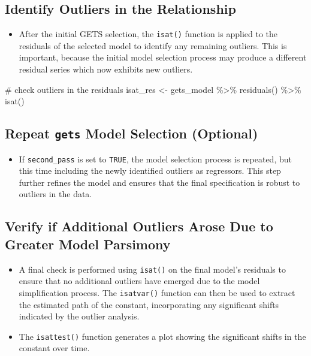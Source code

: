 \documentclass[
  letterpaper,
  DIV=11,
  numbers=noendperiod]{scrreport}
\newenvironment{Shaded}{\begin{snugshade}}{\end{snugshade}}
\newcommand{\CommentTok}[1]{\textcolor[rgb]{0.37,0.37,0.37}{#1}}
\newcommand{\FunctionTok}[1]{\textcolor[rgb]{0.28,0.35,0.67}{#1}}
\newcommand{\NormalTok}[1]{\textcolor[rgb]{0.00,0.23,0.31}{#1}}
\newcommand{\OtherTok}[1]{\textcolor[rgb]{0.00,0.23,0.31}{#1}}
\newcommand{\SpecialCharTok}[1]{\textcolor[rgb]{0.37,0.37,0.37}{#1}}
\providecommand{\tightlist}{%
  \setlength{\itemsep}{0pt}\setlength{\parskip}{0pt}}\usepackage{longtable,booktabs,array}
\begin{document}
\subsection{Identify Outliers in the
Relationship}\label{identify-outliers-in-the-relationship}

\begin{itemize}
\tightlist
\item
  After the initial GETS selection, the \texttt{isat()} function is
  applied to the residuals of the selected model to identify any
  remaining outliers. This is important, because the initial model
  selection process may produce a different residual series which now
  exhibits new outliers.
\end{itemize}

\begin{Shaded}
\begin{Highlighting}[]
\CommentTok{\# check outliers in the residuals}
\NormalTok{isat\_res }\OtherTok{\textless{}{-}}\NormalTok{ gets\_model }\SpecialCharTok{\%\textgreater{}\%}
  \FunctionTok{residuals}\NormalTok{() }\SpecialCharTok{\%\textgreater{}\%}
  \FunctionTok{isat}\NormalTok{()}
\end{Highlighting}
\end{Shaded}

\subsection{\texorpdfstring{Repeat \texttt{gets} Model Selection
(Optional)}{Repeat gets Model Selection (Optional)}}\label{repeat-gets-model-selection-optional}

\begin{itemize}
\tightlist
\item
  If \texttt{second\_pass} is set to \texttt{TRUE}, the model selection
  process is repeated, but this time including the newly identified
  outliers as regressors. This step further refines the model and
  ensures that the final specification is robust to outliers in the
  data.
\end{itemize}

\subsection{Verify if Additional Outliers Arose Due to Greater Model
Parsimony}\label{verify-if-additional-outliers-arose-due-to-greater-model-parsimony}

\begin{itemize}
\tightlist
\item
  A final check is performed using \texttt{isat()} on the final model's
  residuals to ensure that no additional outliers have emerged due to
  the model simplification process. The \texttt{isatvar()} function can
  then be used to extract the estimated path of the constant,
  incorporating any significant shifts indicated by the outlier
  analysis.
\item
  The \texttt{isattest()} function generates a plot showing the
  significant shifts in the constant over time.
\end{itemize}
\end{document}
